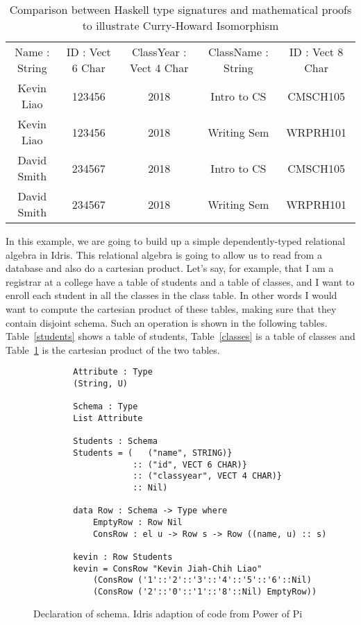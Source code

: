 \begin{table}[h]
    \centering
    \begin{tabular}{|c|c|c|c|c|}
        Name : String & ID : Vect 6 Char & ClassYear : Vect 4 Char & ClassName :
        String & ID : Vect 8 Char\\
        Kevin Liao    & 123456           & 2018       & Intro to CS & CMSCH105 \\
        Kevin Liao    & 123456           & 2018       & Writing Sem & WRPRH101 \\
        David Smith   & 234567           & 2018       & Intro to CS & CMSCH105 \\
        David Smith   & 234567           & 2018       & Writing Sem & WRPRH101 \\
    \end{tabular}
    \caption{Comparison between Haskell type signatures and mathematical proofs to illustrate Curry-Howard Isomorphism}
    \label{cartesian_product}
\end{table}

In this example, we are going to build up a simple dependently-typed relational
algebra in Idris. This relational algebra is going to allow us to read from a
database and also do a cartesian product. Let's say, for example, that I am a
registrar at a college have a table of students and a table of classes, and I
want to enroll each student in all the classes in the class table. In other
words I would want to compute the cartesian product of these tables, making sure
that they contain disjoint schema. Such an operation is shown in the following
tables. Table~\ref{students} shows a table of students, Table~\ref{classes} is a
table of classes and Table~\ref{cartesian_product} is the cartesian product of
the two tables.

\begin{figure}[h]
    \caption{Declaration of schema. Idris adaption of code from Power of Pi \protect\cite{power_of_pi}}
    \label{schema}
    \begin{lstlisting}
        Attribute : Type
        (String, U)

        Schema : Type
        List Attribute

        Students : Schema
        Students = (   ("name", STRING)}
                    :: ("id", VECT 6 CHAR)} 
                    :: ("classyear", VECT 4 CHAR)}
                    :: Nil)

        data Row : Schema -> Type where
            EmptyRow : Row Nil
            ConsRow : el u -> Row s -> Row ((name, u) :: s)

        kevin : Row Students
        kevin = ConsRow "Kevin Jiah-Chih Liao"
            (ConsRow ('1'::'2'::'3'::'4'::'5'::'6'::Nil)
            (ConsRow ('2'::'0'::'1'::'8'::Nil) EmptyRow))
    \end{lstlisting}
\end{figure}

